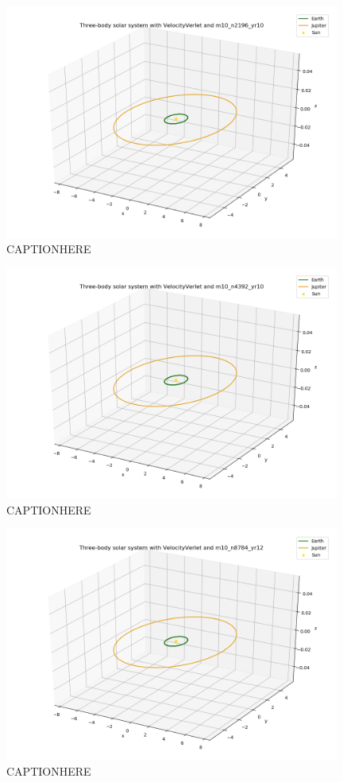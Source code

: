 \documentclass{article}
\begin{document}
    \begin{figure}[H]
        \centering
        \includegraphics[width = 11cm]{img/plot3D_S_E_J_V_m10_n2196_yr10.png}
        \caption{CAPTIONHERE}
        \label{fig:plot3D_S_E_J_V_m10_n2196_yr10}
    \end{figure}

    \begin{figure}[H]
        \centering
        \includegraphics[width = 11cm]{img/plot3D_S_E_J_V_m10_n4392_yr10.png}
        \caption{CAPTIONHERE}
        \label{fig:plot3D_S_E_J_V_m10_n4392_yr10}
    \end{figure}

    \begin{figure}[H]
        \centering
        \includegraphics[width = 11cm]{img/plot3D_S_E_J_V_m10_n8784_yr12.png}
        \caption{CAPTIONHERE}
        \label{fig:plot3D_S_E_J_V_m10_n8784_yr12}
    \end{figure}
\end{document}
